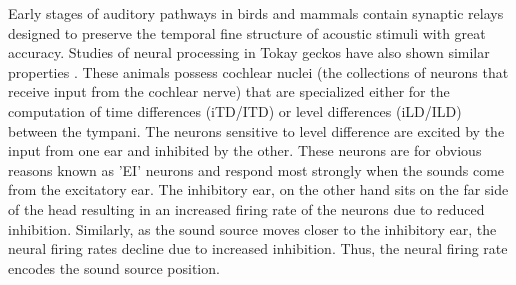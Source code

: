 \documentclass[12pt]{book}
\begin{document}
Early stages of auditory pathways in birds and mammals contain synaptic relays designed to preserve the temporal fine structure of 
acoustic stimuli with great accuracy.  Studies of neural processing in Tokay geckos have also shown similar properties \cite{dalsgaardtangcarr}.
These animals possess cochlear nuclei (the collections of neurons that receive input from the cochlear nerve) that are specialized either for
the computation of time differences (iTD/ITD) or level differences (iLD/ILD) between the tympani. The neurons sensitive to level difference are excited by the 
input from one ear and inhibited by the other. These neurons are for obvious reasons known as 'EI' neurons and respond most strongly when the
sounds come from the excitatory ear. The inhibitory ear, on the other hand sits on the far side of the head resulting in an increased firing
rate of the neurons due to reduced inhibition. Similarly, as the sound source moves closer to the inhibitory ear, the neural firing rates decline
due to increased inhibition. Thus, the neural firing rate encodes the sound source position. 
\end{document}
